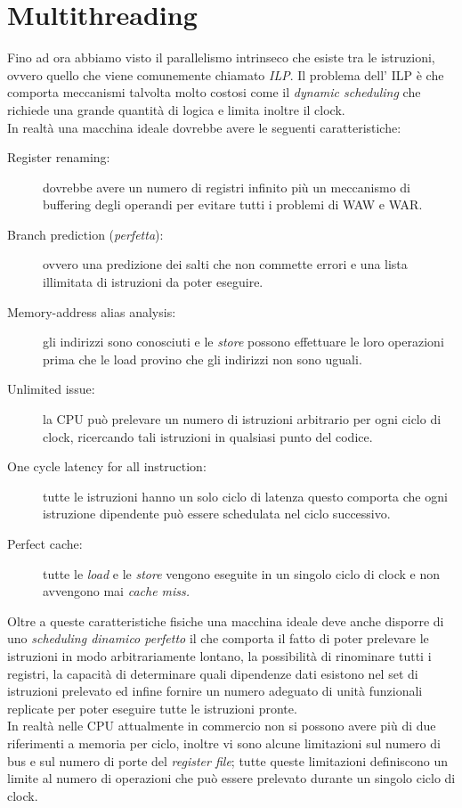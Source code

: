 \section{Multithreading}\label{capitolo51}
Fino ad ora abbiamo visto il parallelismo intrinseco che esiste tra le istruzioni, ovvero quello che viene comunemente chiamato \emph{ILP}. Il problema dell' ILP è che comporta meccanismi talvolta molto costosi come il \emph{dynamic scheduling} che richiede una grande quantità di logica e limita inoltre il clock.\\
In realtà una macchina ideale dovrebbe avere le seguenti caratteristiche:
\begin{description}
\item[Register renaming:] dovrebbe avere un numero di registri infinito più un meccanismo di buffering degli operandi per evitare tutti i problemi di WAW e WAR.
\item[Branch prediction (\emph{perfetta}):] ovvero una predizione dei salti che non commette errori e una lista illimitata di istruzioni da poter eseguire.
\item[Memory-address alias analysis:] gli indirizzi sono conosciuti e le \emph{store} possono effettuare le loro operazioni prima che le load provino che gli indirizzi non sono uguali.
\item[Unlimited issue:] la CPU può prelevare un numero di istruzioni arbitrario per ogni ciclo di clock, ricercando tali istruzioni in qualsiasi punto del codice.
\item[One cycle latency for all instruction:] tutte le istruzioni hanno un solo ciclo di latenza questo comporta che ogni istruzione dipendente può essere schedulata nel ciclo successivo.
\item[Perfect cache:] tutte le \emph{load} e le \emph{store} vengono eseguite in un singolo ciclo di clock e non avvengono mai \emph{cache miss.}
\end{description}
Oltre a queste caratteristiche fisiche una macchina ideale deve anche disporre di uno \emph{scheduling dinamico perfetto} il che comporta il fatto di poter prelevare le istruzioni in modo arbitrariamente lontano, la possibilità di rinominare tutti i registri, la capacità di determinare quali dipendenze dati esistono nel set di istruzioni prelevato ed infine fornire un numero adeguato di unità funzionali replicate per poter eseguire tutte le istruzioni pronte.\\
In realtà nelle CPU attualmente in commercio non si possono avere più di due riferimenti a memoria per ciclo, inoltre vi sono alcune limitazioni sul numero di bus e sul numero di porte del \emph{register file}; tutte queste limitazioni definiscono un limite al numero di operazioni che può essere prelevato durante un singolo ciclo di clock.\\
